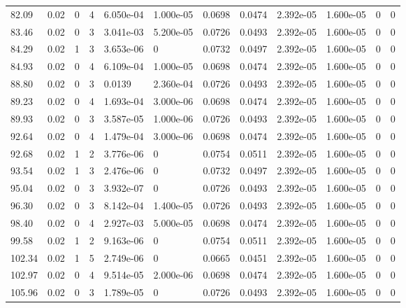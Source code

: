 \documentclass[preview]{standalone}
\begin{document}
{{{\begin{tabular}{L{1.2cm}C{1.2cm} C{0.3cm}C{0.5cm} C{1.4cm}C{1.4cm} C{1.4cm}C{1.4cm} C{1.6cm}C{1.6cm} C{1.6cm}C{1.6cm}}
  82.09  &  0.02  & 0     &  4 &  6.050e-04  & 1.000e-05  &  0.0698&   0.0474& 2.392e-05 & 1.600e-05   &  0 & 0  \\ 
  83.46  &  0.02  & 0     &  3 &  3.041e-03  & 5.200e-05  &  0.0726&   0.0493& 2.392e-05 & 1.600e-05   &  0 & 0  \\ 
  84.29  &  0.02  & 1     &  3 &  3.653e-06  & 0  &  0.0732&   0.0497& 2.392e-05 & 1.600e-05   &  0 & 0  \\ 
  84.93  &  0.02  & 0     &  4 &  6.109e-04  & 1.000e-05  &  0.0698&   0.0474& 2.392e-05 & 1.600e-05   &  0 & 0  \\ 
  88.80  &  0.02  & 0     &  3 &  0.0139  & 2.360e-04  &  0.0726&   0.0493& 2.392e-05 & 1.600e-05   &  0 & 0  \\ 
  89.23  &  0.02  & 0     &  4 &  1.693e-04  & 3.000e-06  &  0.0698&   0.0474& 2.392e-05 & 1.600e-05   &  0 & 0  \\ 
  89.93  &  0.02  & 0     &  3 &  3.587e-05  & 1.000e-06  &  0.0726&   0.0493& 2.392e-05 & 1.600e-05   &  0 & 0  \\ 
  92.64  &  0.02  & 0     &  4 &  1.479e-04  & 3.000e-06  &  0.0698&   0.0474& 2.392e-05 & 1.600e-05   &  0 & 0  \\ 
  92.68  &  0.02  & 1     &  2 &  3.776e-06  & 0  &  0.0754&   0.0511& 2.392e-05 & 1.600e-05   &  0 & 0  \\ 
  93.54  &  0.02  & 1     &  3 &  2.476e-06  & 0  &  0.0732&   0.0497& 2.392e-05 & 1.600e-05   &  0 & 0  \\ 
  95.04  &  0.02  & 0     &  3 &  3.932e-07  & 0  &  0.0726&   0.0493& 2.392e-05 & 1.600e-05   &  0 & 0  \\ 
  96.30  &  0.02  & 0     &  3 &  8.142e-04  & 1.400e-05  &  0.0726&   0.0493& 2.392e-05 & 1.600e-05   &  0 & 0  \\ 
  98.40  &  0.02  & 0     &  4 &  2.927e-03  & 5.000e-05  &  0.0698&   0.0474& 2.392e-05 & 1.600e-05   &  0 & 0  \\ 
  99.58  &  0.02  & 1     &  2 &  9.163e-06  & 0  &  0.0754&   0.0511& 2.392e-05 & 1.600e-05   &  0 & 0  \\ 
  102.34  &  0.02  & 1     &  5 &  2.749e-06  & 0  &  0.0665&   0.0451& 2.392e-05 & 1.600e-05   &  0 & 0  \\ 
  102.97  &  0.02  & 0     &  4 &  9.514e-05  & 2.000e-06  &  0.0698&   0.0474& 2.392e-05 & 1.600e-05   &  0 & 0  \\ 
  105.96  &  0.02  & 0     &  3 &  1.789e-05  & 0  &  0.0726&   0.0493& 2.392e-05 & 1.600e-05   &  0 & 0  \\ 

\end{tabular}}}}
\end{document}
